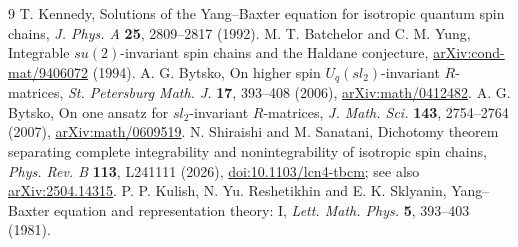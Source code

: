 \documentclass[11pt]{article}
\begin{document}
\begin{thebibliography}{9}
 T. Kennedy, Solutions of the Yang--Baxter equation for isotropic quantum spin chains, \emph{J. Phys. A} \textbf{25}, 2809--2817 (1992).
 M. T. Batchelor and C. M. Yung, Integrable $su(2)$-invariant spin chains and the Haldane conjecture, \href{https://arxiv.org/abs/cond-mat/9406072}{arXiv:cond-mat/9406072} (1994).
 A. G. Bytsko, On higher spin $U_q(sl_2)$-invariant $R$-matrices, \emph{St. Petersburg Math. J.} \textbf{17}, 393--408 (2006), \href{https://arxiv.org/abs/math/0412482}{arXiv:math/0412482}.
 A. G. Bytsko, On one ansatz for $sl_2$-invariant $R$-matrices, \emph{J. Math. Sci.} \textbf{143}, 2754--2764 (2007), \href{https://arxiv.org/abs/math/0609519}{arXiv:math/0609519}.
 N. Shiraishi and M. Sanatani, Dichotomy theorem separating complete integrability and nonintegrability of isotropic spin chains, \emph{Phys. Rev. B} \textbf{113}, L241111 (2026), \href{https://doi.org/10.1103/lcn4-tbcm}{doi:10.1103/lcn4-tbcm}; see also \href{https://arxiv.org/abs/2504.14315}{arXiv:2504.14315}.
 P. P. Kulish, N. Yu. Reshetikhin and E. K. Sklyanin, Yang--Baxter equation and representation theory: I, \emph{Lett. Math. Phys.} \textbf{5}, 393--403 (1981).
\end{thebibliography}
\end{document}
